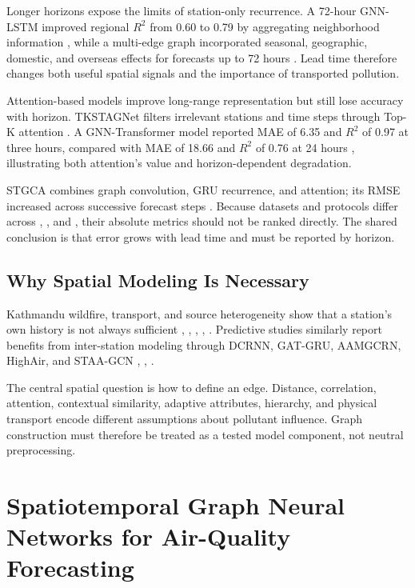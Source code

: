 Longer horizons expose the limits of station-only recurrence. A 72-hour GNN-LSTM improved regional $R^2$ from 0.60 to 0.79 by aggregating neighborhood information \cite{ref15}, while a multi-edge graph incorporated seasonal, geographic, domestic, and overseas effects for forecasts up to 72 hours \cite{ref18}. Lead time therefore changes both useful spatial signals and the importance of transported pollution.

Attention-based models improve long-range representation but still lose accuracy with horizon. TKSTAGNet filters irrelevant stations and time steps through Top-K attention \cite{ref19}. A GNN-Transformer model reported MAE of 6.35 and $R^2$ of 0.97 at three hours, compared with MAE of 18.66 and $R^2$ of 0.76 at 24 hours \cite{ref20}, illustrating both attention's value and horizon-dependent degradation.

STGCA combines graph convolution, GRU recurrence, and attention; its RMSE increased across successive forecast steps \cite{ref21}. Because datasets and protocols differ across \cite{ref15}, \cite{ref20}, and \cite{ref21}, their absolute metrics should not be ranked directly. The shared conclusion is that error grows with lead time and must be reported by horizon.

\subsection{Why Spatial Modeling Is Necessary}

Kathmandu wildfire, transport, and source heterogeneity show that a station's own history is not always sufficient \cite{ref3}, \cite{ref4}, \cite{ref6}, \cite{ref7}, \cite{ref10}. Predictive studies similarly report benefits from inter-station modeling through DCRNN, GAT-GRU, AAMGCRN, HighAir, and STAA-GCN \cite{ref13,ref14,ref15,ref16,ref17}, \cite{ref25}, \cite{ref34}.

The central spatial question is how to define an edge. Distance, correlation, attention, contextual similarity, adaptive attributes, hierarchy, and physical transport encode different assumptions about pollutant influence. Graph construction must therefore be treated as a tested model component, not neutral preprocessing.

\section{Spatiotemporal Graph Neural Networks for Air-Quality Forecasting}

